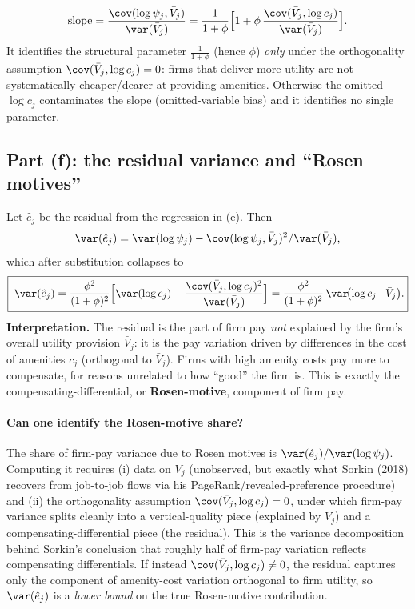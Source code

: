 \documentclass[11pt]{article}
\begin{document}
\[
\text{slope}=\frac{\cov(\log\psi_j,\bar V_j)}{\var(\bar V_j)}
 =\frac{1}{1+\phi}\Bigl[1+\phi\,\frac{\cov(\bar V_j,\log c_j)}{\var(\bar V_j)}\Bigr].
\]
It identifies the structural parameter $\tfrac{1}{1+\phi}$ (hence $\phi$)
\emph{only} under the orthogonality assumption $\cov(\bar V_j,\log c_j)=0$:
firms that deliver more utility are not systematically cheaper/dearer at
providing amenities. Otherwise the omitted $\log c_j$ contaminates the slope
(omitted-variable bias) and it identifies no single parameter.

\subsection*{Part (f): the residual variance and ``Rosen motives''}

Let $\hat e_j$ be the residual from the regression in (e). Then
\[
\var(\hat e_j)=\var(\log\psi_j)-\cov(\log\psi_j,\bar V_j)^2/\var(\bar V_j),
\]
which after substitution collapses to
\begin{equation}
\boxed{\;\var(\hat e_j)=\frac{\phi^2}{(1+\phi)^2}
   \Bigl[\var(\log c_j)-\frac{\cov(\bar V_j,\log c_j)^2}{\var(\bar V_j)}\Bigr]
   =\frac{\phi^2}{(1+\phi)^2}\,\var\!\bigl(\log c_j\mid\bar V_j\bigr).}
\end{equation}
\textbf{Interpretation.} The residual is the part of firm pay \emph{not}
explained by the firm's overall utility provision $\bar V_j$: it is the pay
variation driven by differences in the cost of amenities $c_j$ (orthogonal to
$\bar V_j$). Firms with high amenity costs pay more to compensate, for reasons
unrelated to how ``good'' the firm is. This is exactly the
compensating-differential, or \textbf{Rosen-motive}, component of firm pay.

\paragraph{Can one identify the Rosen-motive share?} The share of firm-pay
variance due to Rosen motives is $\var(\hat e_j)/\var(\log\psi_j)$. Computing it
requires (i) data on $\bar V_j$ (unobserved, but exactly what Sorkin
(2018) recovers from job-to-job flows via his PageRank/revealed-preference
procedure) and (ii) the orthogonality assumption $\cov(\bar V_j,\log c_j)=0$,
under which firm-pay variance splits cleanly into a vertical-quality piece
(explained by $\bar V_j$) and a compensating-differential piece (the residual).
This is the variance decomposition behind Sorkin's conclusion that roughly half
of firm-pay variation reflects compensating differentials. If instead
$\cov(\bar V_j,\log c_j)\neq0$, the residual captures only the component of
amenity-cost variation orthogonal to firm utility, so $\var(\hat e_j)$ is a
\emph{lower bound} on the true Rosen-motive contribution.
\end{document}
